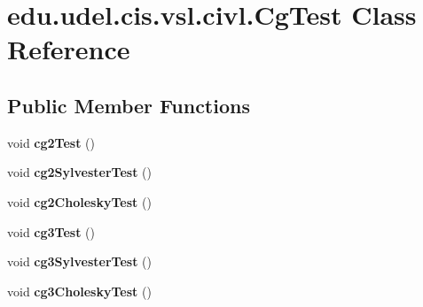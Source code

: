 \hypertarget{classedu_1_1udel_1_1cis_1_1vsl_1_1civl_1_1CgTest}{}\section{edu.\+udel.\+cis.\+vsl.\+civl.\+Cg\+Test Class Reference}
\label{classedu_1_1udel_1_1cis_1_1vsl_1_1civl_1_1CgTest}
\subsection*{Public Member Functions}
\begin{DoxyCompactItemize}
\item 
\hypertarget{classedu_1_1udel_1_1cis_1_1vsl_1_1civl_1_1CgTest_a8624a7dcbefe8a1c844a7b4c06da95f6}{}void {\bfseries cg2\+Test} ()\label{classedu_1_1udel_1_1cis_1_1vsl_1_1civl_1_1CgTest_a8624a7dcbefe8a1c844a7b4c06da95f6}

\item 
\hypertarget{classedu_1_1udel_1_1cis_1_1vsl_1_1civl_1_1CgTest_ae6439863c9c7c5ecaa2387d91739c20e}{}void {\bfseries cg2\+Sylvester\+Test} ()\label{classedu_1_1udel_1_1cis_1_1vsl_1_1civl_1_1CgTest_ae6439863c9c7c5ecaa2387d91739c20e}

\item 
\hypertarget{classedu_1_1udel_1_1cis_1_1vsl_1_1civl_1_1CgTest_af8225c1b92b18e79fba65be076c4c5f5}{}void {\bfseries cg2\+Cholesky\+Test} ()\label{classedu_1_1udel_1_1cis_1_1vsl_1_1civl_1_1CgTest_af8225c1b92b18e79fba65be076c4c5f5}

\item 
\hypertarget{classedu_1_1udel_1_1cis_1_1vsl_1_1civl_1_1CgTest_a575833845d37f2e2b55a6ff2eb42eeef}{}void {\bfseries cg3\+Test} ()\label{classedu_1_1udel_1_1cis_1_1vsl_1_1civl_1_1CgTest_a575833845d37f2e2b55a6ff2eb42eeef}

\item 
\hypertarget{classedu_1_1udel_1_1cis_1_1vsl_1_1civl_1_1CgTest_a004e939f94edc91317464dfd9a304041}{}void {\bfseries cg3\+Sylvester\+Test} ()\label{classedu_1_1udel_1_1cis_1_1vsl_1_1civl_1_1CgTest_a004e939f94edc91317464dfd9a304041}

\item 
\hypertarget{classedu_1_1udel_1_1cis_1_1vsl_1_1civl_1_1CgTest_ad5a3dddc159a26a14d7687bc334dc4e9}{}void {\bfseries cg3\+Cholesky\+Test} ()\label{classedu_1_1udel_1_1cis_1_1vsl_1_1civl_1_1CgTest_ad5a3dddc159a26a14d7687bc334dc4e9}

\end{DoxyCompactItemize}
